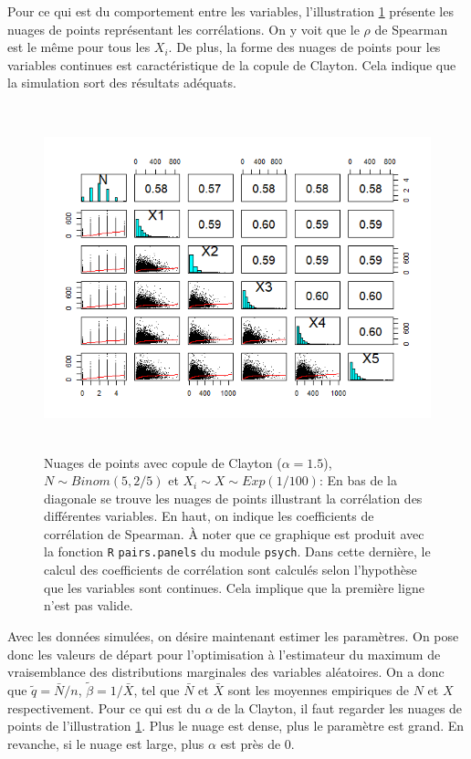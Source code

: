 \documentclass{article}
\begin{document}
		Pour ce qui est du comportement entre les variables, l'illustration \ref{graph_scatterplot_Binom} présente les nuages de points représentant les corrélations. On y voit que le $\rho$ de Spearman est le même pour tous les $X_i$. De plus, la forme des nuages de points pour les variables continues est caractéristique de la copule de Clayton. Cela indique que la simulation sort des résultats adéquats.\\
		
		\begin{figure}[H]
			\centering
			\includegraphics[height=10cm]{Graph/scatterplot_Binom.png}
			\caption[Nuages de points du scénario \ref{scenario_Clayton_Binom}]
			{Nuages de points avec copule de Clayton ($\alpha = 1.5$), $N\sim Binom(5,2/5)$ et $X_i \sim X\sim Exp(1/100)$:
				En bas de la diagonale se trouve les nuages de points illustrant la corrélation des différentes variables. En haut, on indique les coefficients de corrélation de Spearman. À noter que ce graphique est produit avec la fonction \texttt{R} \texttt{pairs.panels} du module \texttt{psych}. Dans cette dernière, le calcul des coefficients de corrélation sont calculés selon l'hypothèse que les variables sont continues. Cela implique que la première ligne n'est pas valide.}
			\label{graph_scatterplot_Binom}
		\end{figure}
		
		Avec les données simulées, on désire maintenant estimer les paramètres. On pose donc les valeurs de départ pour l'optimisation à l'estimateur du maximum de vraisemblance des distributions marginales des variables aléatoires. On a donc que $\tilde{q} = \bar{N}/n$, $\tilde{\beta} = 1/\bar{X}$, tel que $\bar{N}$ et $\bar{X}$ sont les moyennes empiriques de $N$ et $X$ respectivement. Pour ce qui est du $\alpha$ de la Clayton, il faut regarder les nuages de points de  l'illustration \ref{graph_scatterplot_Binom}. Plus le nuage est dense, plus le paramètre est grand. En revanche, si le nuage est large, plus $\alpha$ est près de 0.\\
		
\end{document}
